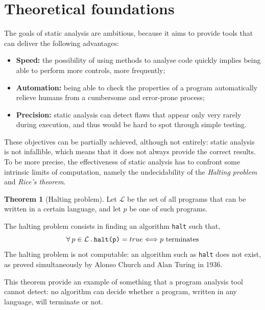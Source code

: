 \documentclass[12pt,a4paper]{book}
\newcommand{\st}{\hspace{2px}.\hspace{2px}}
\theoremstyle{definition}
\begin{document}
	\section{Theoretical foundations}
	The goals of static analysis are ambitious, because it aims to provide tools that can deliver the following advantages:
	\begin{itemize}
		\item \textbf{Speed:} the possibility of using methods to analyse code quickly implies being able to perform more controls, more frequently; 
		\item \textbf{Automation:} being able to check the properties of a program automatically relieve humans from a cumbersome and error-prone process;
		\item \textbf{Precision:} static analysis can detect flaws that appear only very rarely during execution, and thus would be hard to spot through simple testing.
	\end{itemize}
	These objectives can be partially achieved, although not entirely:  static analysis is not infallible, which means that it does not always provide the correct results. To be more precise, the effectiveness of static analysis has to confront some intrinsic limits of computation, namely the undecidability of the \textit{Halting problem} and \textit{Rice's theorem}. 
	\theoremstyle{theorem}
	\newtheorem{thm}{Theorem}
	\begin{thm}[Halting problem] Let $\mathcal{L}$ be the set of all programs that can be written in a certain language, and let $p$ be one of such programs. 
		
		The halting problem consists in finding an algorithm \texttt{halt} such that,  
		\[
		\forall\hspace{2px}p\in\mathcal{L}\st\texttt{halt(p)} = true \Longleftrightarrow p\text{ terminates}
		\]
		The halting problem is not computable: an algorithm such as \texttt{halt} does not exist, as proved simultaneously by Alonso Church \cite{Church1936} and Alan Turing \cite{Turing1937} in 1936.
	\end{thm}
	This theorem provide an example of something that a program analysis tool cannot detect: no algorithm can decide whether a program, written in any language, will terminate or not.
	
\end{document}

